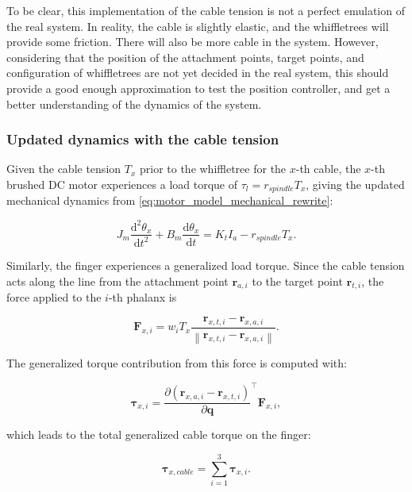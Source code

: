 To be clear, this implementation of the cable tension is not a perfect emulation of the real system. In reality, the cable is slightly elastic, and the whiffletrees will provide some friction. There will also be more cable in the system. However, considering that the position of the attachment points, target points, and configuration of whiffletrees are not yet decided in the real system, this should provide a good enough approximation to test the position controller, and get a better understanding of the dynamics of the system.

\subsubsection{Updated dynamics with the cable tension}

Given the cable tension $T_x$ prior to the whiffletree for the $x$-th cable, the $x$-th brushed DC motor experiences a load torque of $\tau_l = r_{spindle} T_x$, giving the updated mechanical dynamics from \cref{eq:motor_model_mechanical_rewrite}:

\begin{equation}
    \label{eq:motor_dynamics_cable_tension}
    J_m \frac{\mathrm{d}^2\theta_x}{\mathrm{d}t^2}+B_m \frac{\mathrm{d} \theta_x}{\mathrm{d}t} = K_t I_a - r_{spindle} T_x.
\end{equation}

Similarly, the finger experiences a generalized load torque. Since the cable
tension acts along the line from the attachment point $\mathbf{r}_{a,i}$ to the
target point $\mathbf{r}_{t,i}$, the force applied to the $i$-th phalanx is

\begin{equation}
    \mathbf{F}_{x, i}
    =
    w_i T_x
    \frac{
        \mathbf{r}_{x,t,i} - \mathbf{r}_{x,a,i}
    }{
        \left\|
            \mathbf{r}_{x,t,i} - \mathbf{r}_{x,a,i}
        \right\|
    }.
\end{equation}

The generalized torque contribution from this force is computed with:

\begin{equation}
    \boldsymbol{\tau}_{x, i}
    =
    \frac{\partial (\mathbf{r}_{x,a,i} - \mathbf{r}_{x,t,i})}{\partial \mathbf{q}}^\intercal
    \mathbf{F}_{x, i},
\end{equation}

which leads to the total generalized cable torque on the finger:

\begin{equation}
    \boldsymbol{\tau}_{x, cable}
    =
    \sum_{i=1}^{3}
    \boldsymbol{\tau}_{x, i}.
\end{equation}

